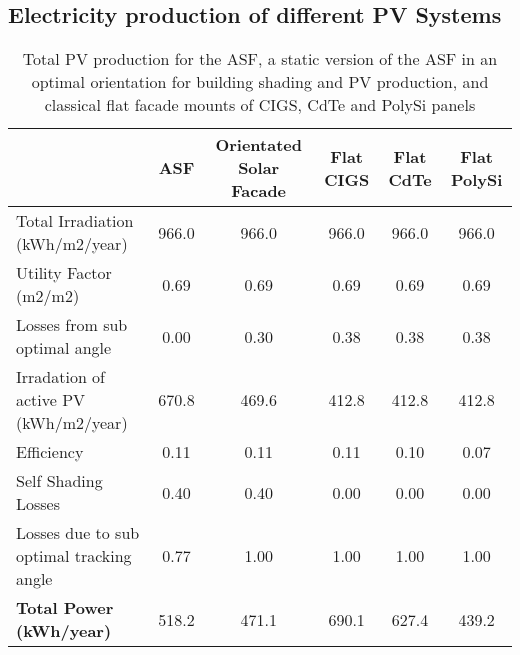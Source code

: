

\subsection{Electricity production of different PV Systems}
\begin{landscape}
\begin{table}
\begin{tabular}{lccccc}
\hline
                                         &  ASF & Orientated Solar Facade & Flat  CIGS & Flat  CdTe & Flat  PolySi \\
\hline
Total Irradiation (kWh/m2/year)          & 966.0      & 966.0      & 966.0             & 966.0             & 966.0               \\
Utility Factor (m2/m2)                   & 0.69       & 0.69       & 0.69              & 0.69              & 0.69                \\
Losses from sub optimal angle            & 0.00       & 0.30       & 0.38              & 0.38              & 0.38                \\
Irradation of active PV  (kWh/m2/year)   & 670.8      & 469.6      & 412.8             & 412.8             & 412.8               \\
Efficiency                               & 0.11       & 0.11       & 0.11              & 0.10              & 0.07                \\
Self Shading Losses                      & 0.40       & 0.40       & 0.00              & 0.00              & 0.00                \\
Losses due to sub optimal tracking angle & 0.77       & 1.00       & 1.00              & 1.00              & 1.00                \\
\textbf{Total Power (kWh/year)}          & 518.2      & 471.1      & 690.1             & 627.4             & 439.2               \\
\hline
\end{tabular}
\caption{Total PV production for the ASF, a static version of the ASF in an optimal orientation for building shading and PV production, and classical flat facade mounts of CIGS, CdTe and PolySi panels}
\label{tab:PVCalc}
\end{table}

\end{landscape}